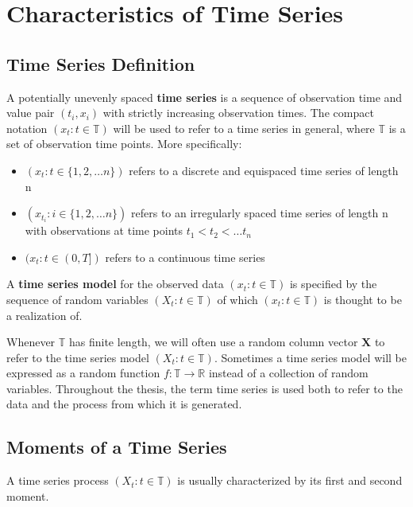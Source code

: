 

\chapter{Characteristics of Time Series}

\section{Time Series Definition}


    A potentially unevenly spaced \textbf{time series} is a sequence of observation time and value pair $(t_i, x_i)$
    with strictly increasing observation times.
    The compact notation $(x_t: t \in \mathbb{T})$ will be used to refer to a time series in general,
    where $\mathbb{T}$ is a set of observation time points. More specifically:
\begin{itemize}
    \item $(x_t: t \in \{1, 2, \dots n\})$ refers to a discrete and equispaced time series of length n
    \item $(x_{t_i}: i \in \{1, 2, \dots n\})$ refers to an irregularly spaced time series of length n
    with observations at time points $t_1 < t_2 < \dots t_n$
    \item $(x_{t}: t \in (0, T])$ refers to a continuous time series
\end{itemize}

    A \textbf{time series model} for the observed data $(x_t: t \in \mathbb{T})$ is specified by the sequence of
    random variables $(X_t: t \in \mathbb{T})$ of which $(x_t: t \in \mathbb{T})$ is thought to be a realization of.

Whenever $\mathbb{T}$ has finite length, we will often use a random column vector $\mathbf{X}$ to refer to
the time series model $(X_t: t \in \mathbb{T})$.
Sometimes a time series model will be expressed as a random function $f: \mathbb{T} \to \mathbb{R}$ instead
of a collection of random variables.
Throughout the thesis, the term time series is used both to refer to the data and the process from which it is generated.

\section{Moments of a Time Series}

A time series process $(X_t: t \in \mathbb{T})$ is usually characterized by its first and second moment.

